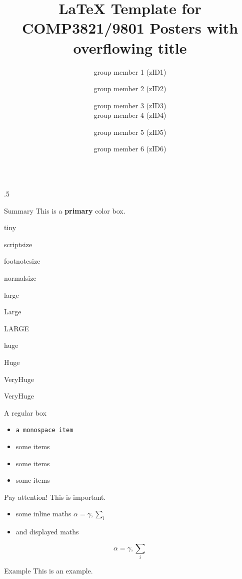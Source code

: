 \documentclass[final,hyperref={pdfpagelabels=false}]{beamer}
\title{\LaTeX{} Template for COMP3821/9801 Posters with overflowing title}
\author{group member 1 (zID1) \and group member 2 (zID2) \and group member 3 (zID3) \\ group member 4 (zID4) \and group member 5 (zID5) \and group member 6 (zID6)}
\institute{Mentor: mentor name\\
Group: group number}
\date{}
\begin{document}
\begin{frame}{}
  \vfill
  \begin{columns}[t]
    \begin{column}{.5\linewidth}
      \begin{mybox}{Summary}
        This is a \textbf{primary} color box.

        \centering
        {\tiny tiny}\par
        {\scriptsize scriptsize}\par
        {\footnotesize footnotesize}\par
        {\normalsize normalsize}\par
        {\large large}\par
        {\Large Large}\par
        {\LARGE LARGE}\par
        {\huge huge}\par
        {\Huge Huge}\par
        {\veryHuge VeryHuge}\par
        {\VeryHuge VeryHuge}\par
      \end{mybox}

      \begin{myindigobox}{A regular box}
        \begin{itemize}
          \item \texttt{a monospace item}
          \item some items
          \item some items
          \item some items
        \end{itemize}
      \end{myindigobox}

      \begin{myredbox}{Pay attention!}
        This is important.
        \begin{itemize}
          \item some inline maths $\alpha=\gamma, \sum_{i}$
          \item and displayed maths
        \end{itemize}
        $$\alpha=\gamma, \sum_{i}$$
      \end{myredbox}

      \begin{mygreenbox}{Example}
        This is an example.
      \end{mygreenbox}


\end{column}
\end{columns}
\end{frame}
\end{document}
